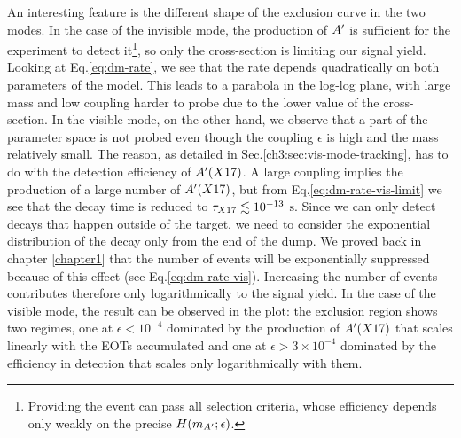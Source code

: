 An interesting feature is the different shape of the exclusion curve in the two modes. In the case of the invisible mode, the production of $A'$ is sufficient for the experiment to detect it\footnote{Providing the event can pass all selection criteria, whose efficiency depends only weakly on the precise $H(m_{A'};\epsilon)$.}, so only the cross-section is limiting our signal yield. Looking at Eq.\ref{eq:dm-rate}, we see that the rate depends quadratically on both parameters of the model. This leads to a parabola in the log-log plane, with large mass and low coupling harder to probe due to the lower value of the cross-section. In the visible mode, on the other hand, we observe that a part of the parameter space is not probed even though the coupling $\epsilon$ is high and the mass relatively small. The reason, as detailed in Sec.\ref{ch3:sec:vis-mode-tracking}, has to do with the detection efficiency of $A'(X17)$. A large coupling implies the production of a large number of $A'(X17)$, but from Eq.\ref{eq:dm-rate-vis-limit} we see that the decay time is reduced to $\tau_{X17} \lesssim 10^{-13}$ $\si{\second}$. Since we can only detect decays that happen outside of the target, we need to consider the exponential distribution of the decay only from the end of the dump. We proved back in chapter \ref{chapter1} that the number of events will be exponentially suppressed because of this effect (see Eq.\ref{eq:dm-rate-vis}). Increasing the number of events contributes therefore only logarithmically to the signal yield. In the case of the visible mode, the result can be observed in the plot: the exclusion region shows two regimes, one at $\epsilon < 10^{-4}$ dominated by the production of $A'(X17)$ that scales linearly with the EOTs accumulated and one at $\epsilon > 3 \times 10^{-4}$ dominated by the efficiency in detection that scales only logarithmically with them.

